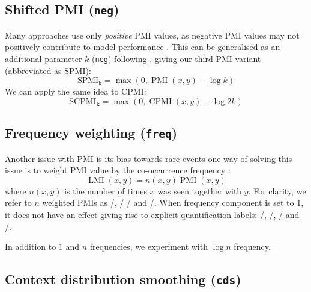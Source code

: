 \documentclass[11pt]{article}
\begin{document}


\subsection{Shifted PMI (\texttt{neg})}
\label{sec:shifted-pmi}

Many approaches use only \emph{positive} PMI values, as  negative PMI values may not positively contribute to model performance \cite{Turney:2010:FMV:1861751.1861756}. This can be generalised as an additional parameter $k$ (\texttt{neg}) following , giving our third PMI variant (abbreviated as SPMI):
%
\begin{equation}
  \label{eq:ppmi}
  \operatorname{SPMI_k} = \max (0, \operatorname{PMI}(x, y) - \log k)
\end{equation}
%
We can apply the same idea to CPMI:
%
\begin{equation}
  \label{eq:pcpmi}
  \operatorname{SCPMI_k} = \max (0, \operatorname{CPMI}(x, y) - \log 2k)
\end{equation}

\subsection{Frequency weighting (\texttt{freq})}
\label{sec:frequency-weighting}

Another issue with PMI is its bias towards rare events \cite{TACL570} one way of solving this issue is to weight PMI value by the co-occurrence frequency \cite{Evert05}:
%
\begin{equation}
  \label{eq:lmi}
  \operatorname{LMI}(x, y) = n(x, y)\operatorname{PMI}(x, y)
\end{equation}
%
where $n(x, y)$ is the number of times $x$ was seen together with $y$. For clarity, we refer to $n$ weighted PMIs as \NPMI/, \NSPMI/ \NCPMI/ and \NSCPMI/. When frequency component is set to 1, it does not have an effect giving rise to explicit quantification labels: \PMI/, \SPMI/, \CPMI/ and \SCPMI/.

In addition to $1$ and $n$ frequencies, we experiment with $\log n$ frequency.



\subsection{Context distribution smoothing (\texttt{cds})}
\label{sec:cont-distr-smooth}
\end{document}
